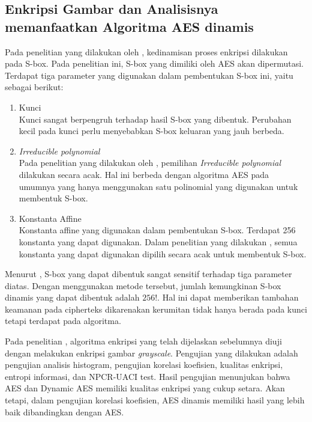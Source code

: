 \subsection{Enkripsi Gambar dan Analisisnya memanfaatkan Algoritma AES dinamis}

Pada penelitian yang dilakukan oleh \textcite{singh2019}, kedinamisan proses enkripsi dilakukan pada S-box. Pada penelitian ini, S-box yang dimiliki oleh AES akan dipermutasi. Terdapat tiga parameter yang digunakan dalam pembentukan S-box ini, yaitu sebagai berikut:
\begin{enumerate}
  \item Kunci\\ Kunci sangat berpengruh terhadap hasil S-box yang dibentuk. Perubahan kecil pada kunci perlu menyebabkan S-box keluaran yang jauh berbeda.
  \item \emph{Irreducible polynomial}\\ Pada penelitian yang dilakukan oleh \textcite{singh2019}, pemilihan \emph{Irreducible polynomial} dilakukan secara acak. Hal ini berbeda dengan algoritma AES pada umumnya yang hanya menggunakan satu polinomial yang digunakan untuk membentuk S-box.
  \item Konstanta Affine\\ Konstanta affine yang digunakan dalam pembentukan S-box. Terdapat 256 konstanta yang dapat digunakan. Dalam penelitian yang dilakukan \textcite{singh2019}, semua konstanta yang dapat digunakan dipilih secara acak untuk membentuk S-box.
\end{enumerate}

Menurut \textcite{singh2019}, S-box yang dapat dibentuk sangat sensitif terhadap tiga parameter diatas. Dengan menggunakan metode tersebut, jumlah kemungkinan S-box dinamis yang dapat dibentuk adalah $256!$. Hal ini dapat memberikan tambahan keamanan pada cipherteks dikarenakan kerumitan tidak hanya berada pada kunci tetapi terdapat pada algoritma.

Pada penelitian \textcite{singh2019}, algoritma enkripsi yang telah dijelaskan sebelumnya diuji dengan melakukan enkripsi gambar \emph{grayscale}. Pengujian yang dilakukan adalah pengujian analisis histogram, pengujian korelasi koefisien, kualitas enkripsi, entropi informasi, dan NPCR-UACI test. Hasil pengujian menunjukan bahwa AES dan Dynamic AES memiliki kualitas enkripsi yang cukup setara. Akan tetapi, dalam pengujian korelasi koefisien, AES dinamis memiliki hasil yang lebih baik dibandingkan dengan AES.
